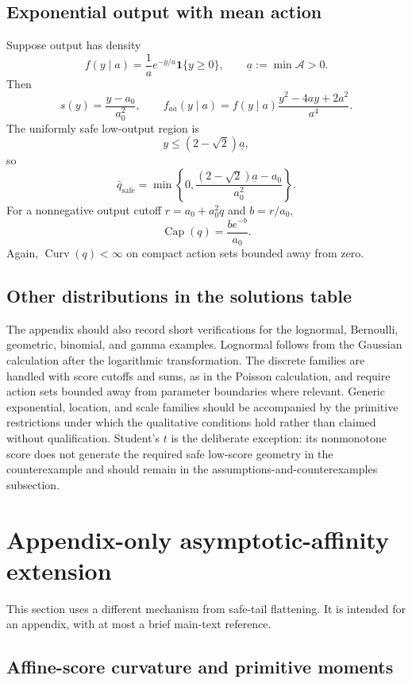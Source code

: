 \documentclass[11pt]{article}
\theoremstyle{remark}
\newcommand{\ind}{\mathbf 1}
\newcommand{\cA}{\mathcal A}
\DeclareMathOperator{\Capacity}{Cap}
\DeclareMathOperator{\Curv}{Curv}
\begin{document}
\subsection{Exponential output with mean action}

Suppose output has density
\[
 f(y\mid a)=\frac1a e^{-y/a}\ind\{y\ge0\},
 \qquad \underline a:=\min\cA>0.
\]
Then
\[
 s(y)=\frac{y-a_0}{a_0^2},
 \qquad
 f_{aa}(y\mid a)=f(y\mid a)
 \frac{y^2-4ay+2a^2}{a^4}.
\]
The uniformly safe low-output region is
\[
 y\le(2-\sqrt2)\underline a,
\]
so
\[
 \bar q_{\mathrm{safe}}
 =\min\left\{0,
 \frac{(2-\sqrt2)\underline a-a_0}{a_0^2}
 \right\}.
\]
For a nonnegative output cutoff $r=a_0+a_0^2q$ and $b=r/a_0$,
\[
 \Capacity(q)=\frac{be^{-b}}{a_0}.
\]
Again, $\Curv(q)<\infty$ on compact action sets bounded away from zero.

\subsection{Other distributions in the solutions table}

The appendix should also record short verifications for the lognormal,
Bernoulli, geometric, binomial, and gamma examples.  Lognormal follows from the
Gaussian calculation after the logarithmic transformation.  The discrete
families are handled with score cutoffs and sums, as in the Poisson calculation,
and require action sets bounded away from parameter boundaries where relevant.
Generic exponential, location, and scale families should be accompanied by the
primitive restrictions under which the qualitative conditions hold rather than
claimed without qualification.  Student's $t$ is the deliberate exception: its
nonmonotone score does not generate the required safe low-score geometry in the
counterexample and should remain in the assumptions-and-counterexamples
subsection.

\section{Appendix-only asymptotic-affinity extension}

This section uses a different mechanism from safe-tail flattening.  It is intended
for an appendix, with at most a brief main-text reference.

\subsection{Affine-score curvature and primitive moments}
\end{document}
